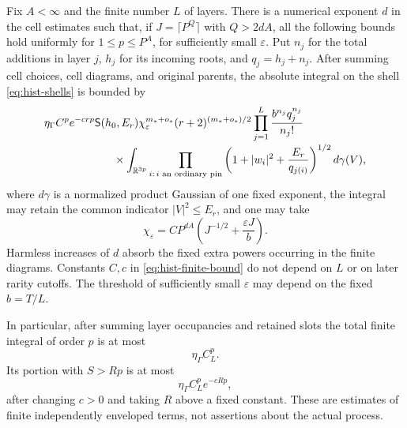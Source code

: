 \begin{proposition}
\label{hist:basic}
Fix $A<\infty$ and the finite number $L$ of layers.  There is a
numerical exponent $d$ in the cell estimates such that, if
$J=\lceil P^Q\rceil$ with $Q>2dA$, all the following bounds hold
uniformly for $1\leq p\leq P^A$, for sufficiently small $\varepsilon$.
Put $n_j$ for the total additions in layer $j$, $h_j$ for its incoming
roots, and $q_j=h_j+n_j$.  After summing cell choices, cell diagrams,
and original parents, the absolute integral on the shell
\eqref{eq:hist-shells} is bounded by
\begin{align}
 &\eta_\Gamma C^p e^{-c rp}\mathsf S(h_0,E_r)
       \chi_\varepsilon^{m_*+o_*}(r+2)^{(m_*+o_*)/2}
       \prod_{j=1}^L\frac{b^{n_j}q_j^{n_j}}{n_j!}
 \nonumber\\[-2pt]
 &\hspace{22mm}\times
  \int_{\mathbb R^{3p}}
       \prod_{\substack{i:\,i\text{ an ordinary pin}}}
          \left(1+|w_i|^2+\frac{E_r}{q_{j(i)}}\right)^{1/2}
       d\gamma(V),
 \label{eq:hist-finite-bound}
\end{align}
where $d\gamma$ is a normalized product Gaussian of one fixed exponent,
the integral may retain the common indicator $|V|^2\leq E_r$,
and one may take
\begin{equation}
 \chi_\varepsilon
   = C P^{dA}\left(J^{-1/2}+\frac{\varepsilon J}{b}\right).
 \label{eq:hist-mesh-gain}
\end{equation}
Harmless increases of $d$ absorb the fixed extra powers occurring in
the finite diagrams.  Constants $C,c$ in
\eqref{eq:hist-finite-bound} do not depend on $L$ or on later rarity
cutoffs.  The threshold of sufficiently small $\varepsilon$ may
depend on the fixed $b=T/L$.

In particular, after summing layer occupancies and retained slots the
total finite integral of order $p$ is at most
\begin{equation}
 \eta_\Gamma C_L^p.
 \label{eq:hist-coarse-exponential}
\end{equation}
Its portion with $S>Rp$ is at most
\begin{equation}
 \eta_\Gamma C_L^p e^{-cRp},
 \label{eq:hist-source-tail}
\end{equation}
after changing $c>0$ and taking $R$ above a fixed constant.
These are estimates of finite independently enveloped terms, not
assertions about the actual process.
\end{proposition}

